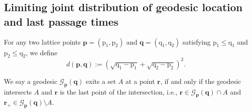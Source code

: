 \documentclass{article}
\numberwithin{equation}{section}
\newcommand{\gd}{{\mathcal{G}}}
\begin{document}
\subsection{Limiting joint distribution of geodesic location and last passage times}

For any two lattice points $\mathbf{p}=(\mathrm{p}_1,\mathrm{p}_2)$ and $\mathbf{q}=(\mathrm{q}_1,\mathrm{q}_2)$ satisfying $\mathrm{p}_1\le \mathrm{q}_1$ and $\mathrm{p}_2\le \mathrm{q}_2$, we define
\begin{equation}
	d(\mathbf{p},\mathbf{q})
	  :=\left(
	           \sqrt{\mathrm{q}_1-\mathrm{p}_1}
	          +\sqrt{\mathrm{q}_2-\mathrm{p}_2}
	    \right)^2.
\end{equation}

We say a geodesic $\gd_{\mathbf{p}}(\mathbf{q})$ exits a set $A$ at a point $\mathbf{r}$, if and only if the geodesic intersects $A$ and $\mathbf{r}$ is the last point of the intersection, i.e., $\mathbf{r}\in\gd_{\mathbf{p}}(\mathbf{q})\cap A$ and $\mathbf{r}_+\in\gd_{\mathbf{p}}(\mathbf{q})\setminus A$.
\end{document}
